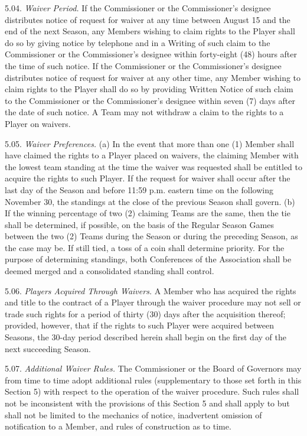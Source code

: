 \documentclass[
]{book}
\begin{document}
5.04. \emph{Waiver Period.} If the Commissioner or the Commissioner's designee distributes notice of request for waiver at any time between August 15 and the end of the next Season, any Members wishing to claim rights to the Player shall do so by giving notice by telephone and in a Writing of such claim to the Commissioner or the Commissioner's designee within forty-eight (48) hours after the time of such notice. If the Commissioner or the Commissioner's designee distributes notice of request for waiver at any other time, any Member wishing to claim rights to the Player shall do so by providing Written Notice of such claim to the Commissioner or the Commissioner's designee within seven (7) days after the date of such notice. A Team may not withdraw a claim to the rights to a Player on waivers.

5.05. \emph{Waiver Preferences.}
(a) In the event that more than one (1) Member shall have claimed the rights to a Player placed on waivers, the claiming Member with the lowest team standing at the time the waiver was requested shall be entitled to acquire the rights to such Player. If the request for waiver shall occur after the last day of the Season and before 11:59 p.m. eastern time on the following November 30, the standings at the close of the previous Season shall govern.
(b) If the winning percentage of two (2) claiming Teams are the same, then the tie shall be determined, if possible, on the basis of the Regular Season Games between the two (2) Teams during the Season or during the preceding Season, as the case may be. If still tied, a toss of a coin shall determine priority. For the purpose of determining standings, both Conferences of the Association shall be deemed merged and a consolidated standing shall control.

5.06. \emph{Players Acquired Through Waivers.} A Member who has acquired the rights and title to the contract of a Player through the waiver procedure may not sell or trade such rights for a period of thirty (30) days after the acquisition thereof; provided, however, that if the rights to such Player were acquired between Seasons, the 30-day period described herein shall begin on the first day of the next succeeding Season.

5.07. \emph{Additional Waiver Rules.} The Commissioner or the Board of Governors may from time to time adopt additional rules (supplementary to those set forth in this Section 5) with respect to the operation of the waiver procedure. Such rules shall not be inconsistent with the provisions of this Section 5 and shall apply to but shall not be limited to the mechanics of notice, inadvertent omission of notification to a Member, and rules of construction as to time.
\end{document}
